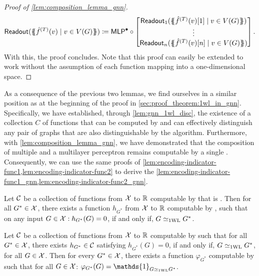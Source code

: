 \begin{proof}[Proof of \cref{lem:composition_lemma_gnn}]
    \begin{align*}
        \textsf{Readout}(\MSopen \hat{f}^{(T)}(v) \mid v \in V(G) \MSclose) \coloneqq \mlp^\bullet \circ \begin{bmatrix}
            \textsf{Readout}_1(\MSopen \hat{f}^{(T)}(v)[1] \mid v \in V(G) \MSclose)\\
            \vdots\\
            \textsf{Readout}_n(\MSopen \hat{f}^{(T)}(v)[n] \mid v \in V(G) \MSclose)
        \end{bmatrix}.
    \end{align*}
    With this, the proof concludes. Note that this proof can easily be extended to work without the assumption of each function mapping into a one-dimensional space.
\end{proof}

As a consequence of the previous two lemmas, we find ourselves in a similar position as at the beginning of the proof in \cref{sec:proof_theorem:1wl_in_gnn}. Specifically, we have established, through \cref{lem:gnn_1wl_disc}, the existence of a collection $C$ of functions that can be computed by \gnns and can effectively distinguish any pair of graphs that are also distinguishable by the \wl algorithm. Furthermore, with \cref{lem:composition_lemma_gnn}, we have demonstrated that the composition of multiple \gnns and a multilayer perceptron remains computable by a single \gnn. Consequently, we can use the same proofs of \cref{lem:encoding-indicator-func1,lem:encoding-indicator-func2} to derive the \cref{lem:encoding-indicator-func1_gnn,lem:encoding-indicator-func2_gnn}.

\begin{corollary}\label{lem:encoding-indicator-func1_gnn}
    Let $\mathcal{C}$ be a collection of functions from $\mathcal{X}$ to $\mathbb{R}$ computable by \gnns that is \wldisc. Then for all $G^* \in \mathcal{X}$, there exists a function $h_{G^*}$ from $\mathcal{X}$ to $\mathbb{R}$ computable by \gnn, such that on any input $G \in \mathcal{X}: h_{G^*}(G) = 0$, if and only if, $G \simeq_{\text{1WL}} G^*$.
\end{corollary}
\begin{corollary}\label{lem:encoding-indicator-func2_gnn}
    Let $\mathcal{C}$ be a collection of functions from $\mathcal{X}$ to $\mathbb{R}$ computable by \gnns such that for all $G^* \in \mathcal{X}$, there exists $h_{G^*} \in \mathcal{C}$ satisfying $h_{G^*}(G) = 0 $, if and only if, $G \simeq_{\text{1WL}} G^*$, for all $G \in \mathcal{X}$. Then for every $G^* \in \mathcal{X}$, there exists a function $\varphi_{G^*} $ computable by \gnns such that for all $G \in \mathcal{X}$: $\varphi_{G^*}(G) = \mathds{1}_{G \wliso G^*}$.
\end{corollary}

